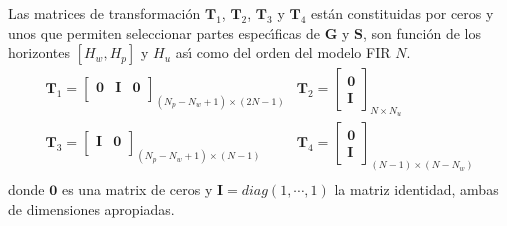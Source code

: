 Las matrices de transformaci{\'o}n $\mathbf{T}_{1}$, $\mathbf{T}_{2}$, $\mathbf{T}_{3}$ y $\mathbf{T}_{4}$ est{\'a}n
constituidas por ceros y unos que permiten seleccionar partes espec{\'\i}ficas de $\mathbf{G}$ y $\mathbf{S}$,
son funci{\'o}n de los horizontes $[H_w,H_p]$ y $H_u$ as{\'\i} como del orden del modelo FIR $N$.
\begin{equation}
\begin{array}{ll}
  \mathbf{T}_1=\left[
    \begin{array}{ccc}
     \mathbf{0} & \mathbf{I} & \mathbf{0} \\
    \end{array}
    \right]_{(N_p-N_w+1)\times (2N-1)}
  & \mathbf{T}_2=\left[
    \begin{array}{c}
    \mathbf{0}\\
    \mathbf{I}
    \end{array}
    \right]_{N\times N_u} \\
  \mathbf{T}_3=\left[
    \begin{array}{cc}
     \mathbf{I} & \mathbf{0}\\
    \end{array}
    \right]_{(N_p-N_w+1)\times (N-1)}
  & \mathbf{T}_4=\left[
    \begin{array}{c}
    \mathbf{0}\\
    \mathbf{I}
    \end{array}
    \right]_{(N-1)\times (N-N_w)} \\
\end{array}
\end{equation}
donde $\mathbf{0}$ es una matrix de ceros y $\mathbf{I}=diag(1,\cdots,1)$ la matriz identidad, ambas de
dimensiones apropiadas.

